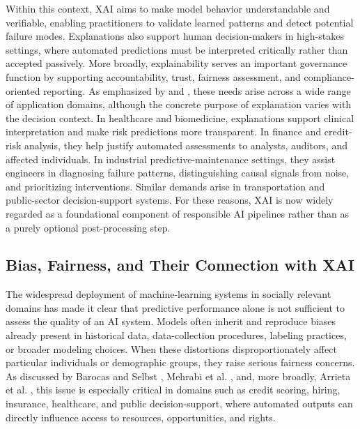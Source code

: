 Within this context, XAI aims to make model behavior understandable and verifiable, enabling practitioners to validate learned patterns and detect potential failure modes. Explanations also support human decision-makers in high-stakes settings, where automated predictions must be interpreted critically rather than accepted passively. More broadly, explainability serves an important governance function by supporting accountability, trust, fairness assessment, and compliance-oriented reporting. As emphasized by \textcite{adadi2018peeking} and \textcite{arrieta2020explainable}, these needs arise across a wide range of application domains, although the concrete purpose of explanation varies with the decision context. In healthcare and biomedicine, explanations support clinical interpretation and make risk predictions more transparent. In finance and credit-risk analysis, they help justify automated assessments to analysts, auditors, and affected individuals. In industrial predictive-maintenance settings, they assist engineers in diagnosing failure patterns, distinguishing causal signals from noise, and prioritizing interventions. Similar demands arise in transportation and public-sector decision-support systems. For these reasons, XAI is now widely regarded as a foundational component of responsible AI pipelines rather than as a purely optional post-processing step.

\subsection{Bias, Fairness, and Their Connection with XAI}
The widespread deployment of machine-learning systems in socially relevant domains has made it clear that predictive performance alone is not sufficient to assess the quality of an AI system. Models often inherit and reproduce biases already present in historical data, data-collection procedures, labeling practices, or broader modeling choices. When these distortions disproportionately affect particular individuals or demographic groups, they raise serious fairness concerns. As discussed by Barocas and Selbst \cite{barocas2016big}, Mehrabi et al. \cite{mehrabi2021}, and, more broadly, Arrieta et al. \cite{arrieta2020explainable}, this issue is especially critical in domains such as credit scoring, hiring, insurance, healthcare, and public decision-support, where automated outputs can directly influence access to resources, opportunities, and rights.

